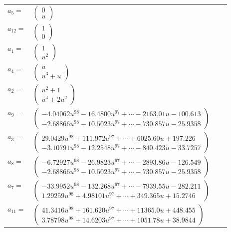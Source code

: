 \documentclass[1p]{elsarticle_modified}
\theoremstyle{definition}
\begin{document}
\begin{tabular}{m{7pt} m{180pt} m{7pt} m{180pt} }
\flushright $a_{5}=$&$\begin{pmatrix}0\\u\end{pmatrix}$ \\
\flushright $a_{12}=$&$\begin{pmatrix}1\\0\end{pmatrix}$ \\
\flushright $a_{1}=$&$\begin{pmatrix}1\\u^2\end{pmatrix}$ \\
\flushright $a_{4}=$&$\begin{pmatrix}u\\u^3+u\end{pmatrix}$ \\
\flushright $a_{2}=$&$\begin{pmatrix}u^2+1\\u^4+2 u^2\end{pmatrix}$ \\
\flushright $a_{9}=$&$\begin{pmatrix}-4.04062 u^{98}-16.4800 u^{97}+\cdots-2163.01 u-100.613\\-2.68866 u^{98}-10.5023 u^{97}+\cdots-730.857 u-25.9358\end{pmatrix}$ \\
\flushright $a_{3}=$&$\begin{pmatrix}29.0429 u^{98}+111.972 u^{97}+\cdots+6025.60 u+197.226\\-3.10791 u^{98}-12.2548 u^{97}+\cdots-840.423 u-33.7257\end{pmatrix}$ \\
\flushright $a_{8}=$&$\begin{pmatrix}-6.72927 u^{98}-26.9823 u^{97}+\cdots-2893.86 u-126.549\\-2.68866 u^{98}-10.5023 u^{97}+\cdots-730.857 u-25.9358\end{pmatrix}$ \\
\flushright $a_{7}=$&$\begin{pmatrix}-33.9952 u^{98}-132.268 u^{97}+\cdots-7939.55 u-282.211\\1.29259 u^{98}+4.98101 u^{97}+\cdots+349.365 u+15.2746\end{pmatrix}$ \\
\flushright $a_{11}=$&$\begin{pmatrix}41.3416 u^{98}+161.620 u^{97}+\cdots+11365.0 u+448.455\\3.78798 u^{98}+14.6203 u^{97}+\cdots+1051.78 u+38.9844\end{pmatrix}$ \\

\end{tabular}
\end{document}

